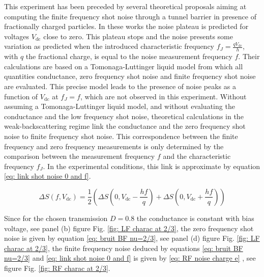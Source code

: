This experiment has been preceded by several theoretical proposals \cite{crepieux2004photoassisted,ferraro2014multiple,carrega2014finite,carrega2012spectral} aiming at computing the finite frequency shot noise through a tunnel barrier in presence of fractionally charged particles.
In these works the noise plateau is predicted for voltages $V_{\mathrm{dc}}$ close to zero.
This plateau stops and the noise presents some variation as predicted when the introduced characteristic frequency $f_{J} = \frac{qV_{\mathrm{dc}}}{h}$, with $q$ the fractional charge, is equal to the noise measurement frequency $f$.
Their calculations are based on a Tomonaga-Luttinger liquid model from which all quantities conductance, zero frequency shot noise and finite frequency shot noise are evaluated.
This precise model leads to the presence of noise peaks as a function of $V_{\mathrm{dc}}$ at $f_{J} = f$, which are not observed in this experiment.
Without assuming a Tomonaga-Luttinger liquid model, and without evaluating the conductance and the low frequency shot noise, theoretical calculations \cite{roussel2016perturbative} in the weak-backscattering regime link the conductance and the zero frequency shot noise to finite frequency shot noise.
This correspondence between the finite frequency and zero frequency measurements is only determined by the comparison between the measurement frequency $f$ and the characteristic frequency $f_{J}$.
In the experimental conditions, this link is approximate by equation \eqref{eq: link shot noise 0 and f}.

\begin{equation}
\Delta S\left(f,V_{\mathrm{dc}}\right) = \frac{1}{2}\left(\Delta S\left(0,V_{\mathrm{dc}}-\frac{hf}{q}\right)+\Delta S\left(0,V_{\mathrm{dc}}+\frac{hf}{q}\right)\right) \label{eq: link shot noise 0 and f}
\end{equation}

Since for the chosen transmission $D = 0.8$ the conductance is constant with bias voltage, see panel (b) figure Fig. \ref{fig: LF charac at 2/3}, the zero frequency shot noise is given by equation \eqref{eq: bruit BF nu=2/3}, see panel (d) figure Fig. \ref{fig: LF charac at 2/3}, the finite frequency noise deduced by equations \eqref{eq: bruit BF nu=2/3} and \eqref{eq: link shot noise 0 and f} is given by \eqref{eq: RF noise charge e} , see figure Fig. \ref{fig: RF charac at 2/3}.

